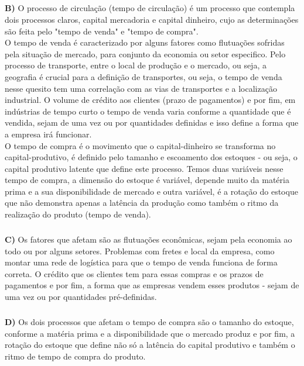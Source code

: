 \documentclass[a4paper, 12pt]{article} %
\begin{document}
\subparagraph{} \textbf{B)} O processo de circulação (tempo de circulação) é um processo que contempla dois processos claros, capital mercadoria e capital dinheiro, cujo as determinações são feita pelo "tempo de venda" e "tempo de compra".
\\
O tempo de venda é caracterizado por alguns fatores como flutuações sofridas pela situação de mercado, para conjunto da economia ou setor especifico. Pelo processo de transporte, entre o local de produção e o mercado, ou seja, a geografia é crucial para a definição de transportes, ou seja, o tempo de venda nesse quesito tem uma correlação com as vias de transportes e a localização industrial. O volume de crédito aos clientes (prazo de pagamentos) e por fim, em indústrias de tempo curto o tempo de venda varia conforme a quantidade que é vendida, sejam de uma vez ou por quantidades definidas e isso define a forma que a empresa irá funcionar.
\\
O tempo de compra é o movimento que o capital-dinheiro se transforma no capital-produtivo, é definido pelo tamanho e escoamento dos estoques - ou seja, o capital produtivo latente que define este processo. Temos duas variáveis nesse tempo de compra, a dimensão do estoque é variável, depende muito da matéria prima e a sua disponibilidade de mercado e outra variável, é a rotação do estoque que não demonstra apenas a latência da produção como também o ritmo da realização do produto (tempo de venda).

\subparagraph{} \textbf{C)} Os fatores que afetam são as flutuações econômicas, sejam pela economia ao todo ou por alguns setores. Problemas com fretes e local da empresa, como montar uma rede de logística para que o tempo de venda funciona de forma correta. O crédito que os clientes tem para essas compras e os prazos de pagamentos e por fim, a forma que as empresas vendem esses produtos - sejam de uma vez ou por quantidades pré-definidas. 

\subparagraph{} \textbf{D)} Os dois processos que afetam o tempo de compra são o tamanho do estoque, conforme a matéria prima e a disponibilidade que o mercado produz e por fim, a rotação do estoque que define não só a latência do capital produtivo e também o ritmo de tempo de compra do produto.

\vspace{0.5cm}
\end{document}
